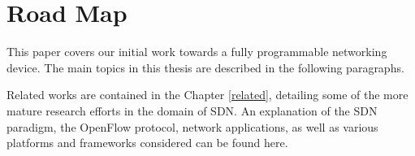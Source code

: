 %
%

\section{Road Map}
\label{intro:map}
This paper covers our initial work towards a fully programmable networking
device. The main topics in this thesis are described in the following paragraphs.

Related works are contained in the Chapter \ref{related}, detailing some of the more mature research efforts in the domain of SDN. An explanation of the SDN paradigm, the OpenFlow protocol, network applications, as well as various
platforms and frameworks considered can be found here.

